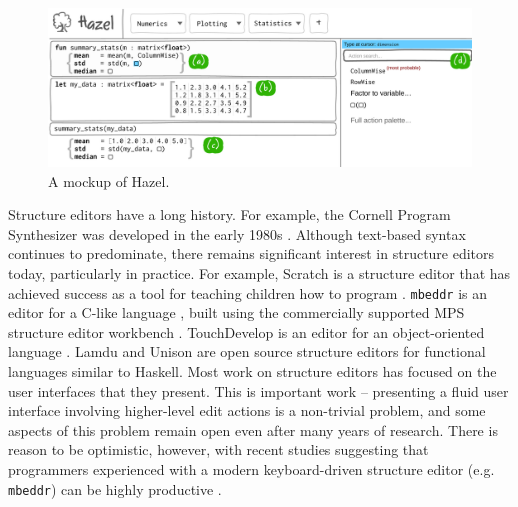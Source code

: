 \documentclass[letterpaper,USenglish]{lipics-v2016}
\newcommand{\Hazel}[0]{\textsf{Hazel}}
\newcommand{\HazelEnv}[0]{\Hazel}
\begin{document}
\begin{figure}
\includegraphics[width=1.025\textwidth]{mockup-1}
\vspace{-5px}
\caption{A mockup of \HazelEnv.}
\vspace{-6px}
\label{fig:hazel-mockup}
\vspace{-6px}
\end{figure}


Structure editors have a long history. For example, the Cornell Program
Synthesizer was developed in the early 1980s \cite{teitelbaum_cornell_1981}. 
Although text-based syntax continues to predominate, there remains significant   
 interest in structure editors today, particularly in practice. For example,  Scratch is a 
structure editor that has achieved success as a tool for teaching children
how to program \cite{Resnick:2009:SP:1592761.1592779}. \texttt{mbeddr} is an editor for a C-like
language \cite{voelter_mbeddr:_2012}, built using the commercially supported MPS structure editor workbench \cite{voelter2011language}. TouchDevelop is an editor for an
object-oriented language \cite{tillmann_touchdevelop:_2011}. Lamdu \cite{lamdu} and Unison \cite{unison} are open source structure
editors for functional languages similar to Haskell. Most work on structure editors has focused on the user
interfaces that they present. This is important work -- presenting a
fluid user interface involving higher-level edit actions is a non-trivial
problem, and some aspects of this problem remain open even after many years of research. There is reason to be optimistic, however, with recent studies 
suggesting that programmers experienced with a modern keyboard-driven structure editor (e.g. \texttt{mbeddr}) 
can be highly productive \cite{DBLP:conf/vl/Asenov014,DBLP:conf/sle/VolterSBK14}.
\end{document}
